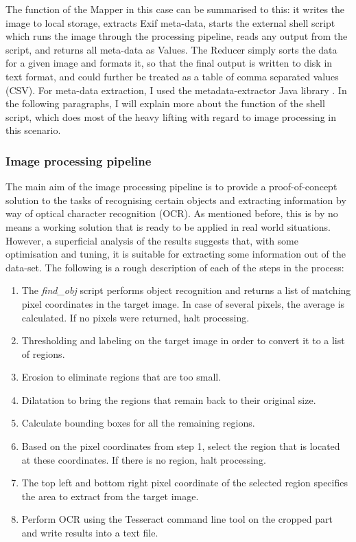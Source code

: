 \documentclass [12pt,a4paper]{report}
\begin{document}
The function of the Mapper in this case can be summarised to this: it writes the image to local storage, extracts Exif meta-data, starts the external shell script which runs the image through the processing pipeline, reads any output from the script, and returns all meta-data as Values. The Reducer simply sorts the data for a given image and formats it, so that the final output is written to disk in text format, and could further be treated as a table of comma separated values (CSV). For meta-data extraction, I used the metadata-extractor Java library \cite{metadataextractor}. In the following paragraphs, I will explain more about the function of the shell script, which does most of the heavy lifting with regard to image processing in this scenario.

\subsubsection{Image processing pipeline}
\label{pipeline}

The main aim of the image processing pipeline is to provide a proof-of-concept solution to the tasks of recognising certain objects and extracting information by way of optical character recognition (OCR). As mentioned before, this is by no means a working solution that is ready to be applied in real world situations. However, a superficial analysis of the results suggests that, with some optimisation and tuning, it is suitable for extracting some information out of the data-set. The following is a rough description of each of the steps in the process:
\begin{enumerate}
\item The \textit{find\_obj} script performs object recognition and returns a list of matching pixel coordinates in the target image. In case of several pixels, the average is calculated. If no pixels were returned, halt processing.
\item Thresholding and labeling on the target image in order to convert it to a list of regions.
\item Erosion to eliminate regions that are too small.
\item Dilatation to bring the regions that remain back to their original size.
\item Calculate bounding boxes for all the remaining regions.
\item Based on the pixel coordinates from step 1, select the region that is located at these coordinates. If there is no region, halt processing.
\item The top left and bottom right pixel coordinate of the selected region specifies the area to extract from the target image.
\item Perform OCR using the Tesseract command line tool on the cropped part and write results into a text file.
\end{enumerate}
\end{document}
